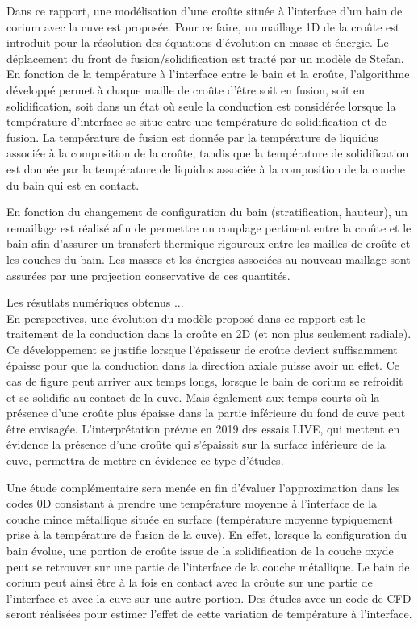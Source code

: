 Dans ce rapport, une modélisation d'une croûte située à l'interface d'un bain de corium avec la cuve est proposée. Pour ce faire, un maillage 1D de la croûte est introduit pour la résolution des équations d'évolution en masse et énergie. Le déplacement du front de fusion/solidification est traité par un modèle de Stefan. En fonction de la température à l'interface entre le bain et la croûte, l'algorithme développé permet à chaque maille de croûte d'être soit en fusion, soit en solidification, soit dans un état où seule la conduction est considérée lorsque la température d'interface se situe entre une température de solidification et de fusion. La température de fusion est donnée par la température de liquidus associée à la composition de la croûte, tandis que la température de solidification est donnée par la température de liquidus associée à la composition de la couche du bain qui est en contact. 

En fonction du changement de configuration du bain (stratification, hauteur), un remaillage est réalisé afin de permettre un couplage pertinent entre la croûte et le bain afin d'assurer un transfert thermique rigoureux entre les mailles de croûte et les couches du bain. Les masses et les énergies associées au nouveau maillage sont assurées par une projection conservative de ces quantités.

Les résutlats numériques obtenus ...\\

En perspectives, une évolution du modèle proposé dans ce rapport est le traitement de la conduction dans la croûte en 2D (et non plus seulement radiale). Ce développement se justifie lorsque l'épaisseur de croûte devient suffisamment épaisse pour que la conduction dans la direction axiale puisse avoir un effet. Ce cas de figure peut arriver aux temps longs, lorsque le bain de corium se refroidit et se solidifie au contact de la cuve. Mais également aux temps courts où la présence d'une croûte plus épaisse dans la partie inférieure du fond de cuve peut être envisagée. L'interprétation prévue en 2019 des essais LIVE, qui mettent en évidence la présence d'une croûte qui s'épaissit sur la surface inférieure de la cuve, permettra de mettre en évidence ce type d'études. 

Une étude complémentaire sera menée en fin d'évaluer l'approximation dans les codes 0D consistant à prendre une température moyenne à l'interface de la couche mince métallique située en surface (température moyenne typiquement prise à la température de fusion de la cuve). En effet, lorsque la configuration du bain évolue, une portion de croûte issue de la solidification de la couche oxyde peut se retrouver sur une partie de l'interface de la couche métallique. Le bain de corium peut ainsi être à la fois en contact avec la crôute  sur une partie de l'interface et avec la cuve sur une autre portion. Des études avec un code de CFD seront réalisées pour estimer l'effet de cette variation de température à l'interface.